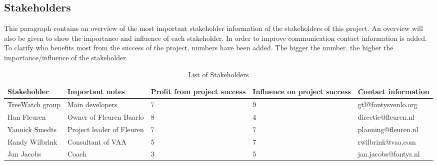 \subsection{Stakeholders}
This paragraph contains an overview of the most important stakeholder information of the stakeholders of this project. An overview will also be given to show the importance and influence of each stakeholder. In order to improve communication contact information is added. To clarify who benefits most from the success of the project, numbers have been added. The bigger the number, the higher the importance/influence of the stakeholder.

\begin{table}[htbp]
	\begin{tabular}{ p{}  p{3cm}  p{}  p{}  p{} }
		\textbf{Stakeholder} & \textbf{Important notes} & \textbf{Profit from project success} & \textbf{Influence on project success} & \textbf{Contact information} \\ \hline
		TreeWatch group & Main developers & 7 & 9 & gtl@fontysvenlo.org \\
		Han Fleuren & Owner of Fleuren Baarlo & 8 & 4 & directie@fleuren.nl \\
		Yannick Smedts & Project leader of Fleuren & 7 & 7 & planning@fleuren.nl \\
		Randy Wilbrink & Consultant of VAA & 5 & 7 & rwilbrink@vaa.com \\
		Jan Jacobs & Coach & 3 & 5 & jan.jacobs@fontys.nl
	\end{tabular}
	\caption{List of Stakeholders\label{stakeholders}}
\end{table}
